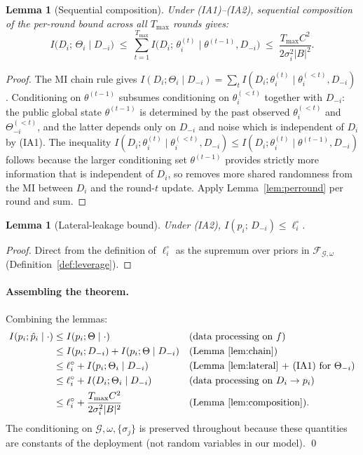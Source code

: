 \documentclass[letterpaper,journal]{IEEEtran}
\newtheorem{lemma}[theorem]{Lemma}
\newcommand{\TOPO}{\mathcal{G}}
\newcommand{\FAM}{\mathcal{F}}
\newcommand{\Tmax}{T_{\max}}
\begin{document}
\begin{lemma}[Sequential composition]
\label{lem:composition}
Under (IA1)--(IA2), sequential composition of the per-round bound
across all $\Tmax$ rounds gives:
\[
I\big(D_i;\, \Theta_i \;\big|\; D_{-i}\big)
\;\leq\;
\sum_{t=1}^{\Tmax} I\big(D_i;\, \theta_i^{(t)} \;\big|\; \theta^{(t-1)}, D_{-i}\big)
\;\leq\;
\frac{\Tmax C^2}{2\sigma_i^2 |B|^2}.
\]
\end{lemma}
\begin{proof}
The MI chain rule gives
\(I(D_i;\Theta_i \mid D_{-i}) = \sum_t I(D_i; \theta_i^{(t)} \mid \theta_i^{(<t)}, D_{-i})\).
Conditioning on $\theta^{(t-1)}$ subsumes conditioning on
$\theta_i^{(<t)}$ together with $D_{-i}$: the public global state
$\theta^{(t-1)}$ is determined by the past observed $\theta_i^{(<t)}$ and
$\Theta_{-i}^{(<t)}$, and the latter depends only on $D_{-i}$ and noise
which is independent of $D_i$ by (IA1). The
inequality
\(I(D_i; \theta_i^{(t)} \mid \theta_i^{(<t)}, D_{-i})
   \leq I(D_i; \theta_i^{(t)} \mid \theta^{(t-1)}, D_{-i})\)
follows because the larger conditioning set $\theta^{(t-1)}$ provides
strictly more information that is independent of $D_i$, so removes more
shared randomness from the MI between $D_i$ and the round-$t$ update.
Apply Lemma~\ref{lem:perround} per round and sum.
\end{proof}

\begin{lemma}[Lateral-leakage bound]
\label{lem:lateral}
Under (IA2),
\(I(p_i;\, D_{-i}) \leq \ell_i^\circ\).
\end{lemma}
\begin{proof}
Direct from the definition of $\ell_i^\circ$ as the supremum over
priors in $\FAM_{\TOPO,\omega}$ (Definition~\ref{def:leverage}).
\end{proof}

\paragraph{Assembling the theorem.}
Combining the lemmas:
\begin{align*}
I(p_i;\hat p_i \mid \cdot)
&\leq I(p_i;\Theta \mid \cdot)
  && \text{(data processing on }f\text{)} \\
&\leq I(p_i;D_{-i}) + I(p_i;\Theta \mid D_{-i})
  && \text{(Lemma~\ref{lem:chain})} \\
&\leq \ell_i^\circ + I(p_i;\Theta_i \mid D_{-i})
  && \text{(Lemma~\ref{lem:lateral} + (IA1) for }\Theta_{-i}\text{)} \\
&\leq \ell_i^\circ + I(D_i;\Theta_i \mid D_{-i})
  && \text{(data processing on } D_i \to p_i \text{)} \\
&\leq \ell_i^\circ + \frac{\Tmax C^2}{2\sigma_i^2 |B|^2}
  && \text{(Lemma~\ref{lem:composition}).}
\end{align*}
The conditioning on $\TOPO, \omega, \{\sigma_j\}$ is preserved
throughout because these quantities are constants of the deployment
(not random variables in our model). \qed
\end{document}
